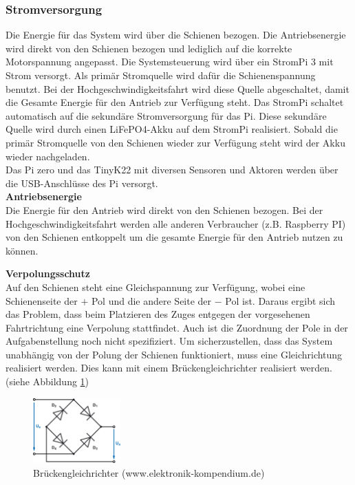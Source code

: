 \documentclass[../../main.tex]{subfiles}
\begin{document}
    \subsubsection{Stromversorgung} \label{et_stromversorgung}
    Die Energie für das System wird über die Schienen bezogen. Die Antriebsenergie wird direkt von den Schienen bezogen und lediglich auf die korrekte Motorspannung angepasst. Die
    Systemsteuerung wird über ein StromPi 3 mit Strom versorgt. Als primär Stromquelle wird dafür die Schienenspannung
    benutzt. Bei der Hochgeschwindigkeitsfahrt wird diese Quelle abgeschaltet, damit die Gesamte Energie für den Antrieb
    zur Verfügung steht. Das StromPi schaltet automatisch auf die sekundäre Stromversorgung für das Pi. Diese sekundäre
    Quelle wird durch einen LiFePO4-Akku auf dem StromPi realisiert. Sobald die primär Stromquelle von den Schienen
    wieder zur Verfügung steht wird der Akku wieder nachgeladen.\\
    Das Pi zero und das TinyK22 mit diversen Sensoren und Aktoren werden über die USB-Anschlüsse des Pi versorgt.\\

    \textbf{Antriebsenergie}\\
    Die Energie für den Antrieb wird direkt von den Schienen bezogen. Bei der Hochgeschwindigkeitsfahrt werden alle anderen Verbraucher (z.B. Raspberry PI) von den Schienen entkoppelt um die gesamte Energie für den Antrieb nutzen zu können.

    \textbf{Verpolungsschutz}\\
    Auf den Schienen steht eine Gleichspannung zur Verfügung, wobei eine Schienenseite der $+$ Pol und die andere Seite der $-$ Pol ist. Daraus ergibt sich das Problem, dass beim Platzieren des Zuges entgegen der vorgesehenen Fahrtrichtung eine Verpolung stattfindet. Auch ist die Zuordnung der Pole in der Aufgabenstellung noch nicht spezifiziert. Um sicherzustellen, dass das System unabhängig von der Polung der Schienen funktioniert, muss eine Gleichrichtung realisiert werden. Dies kann mit einem Brückengleichrichter realisiert werden. (siehe Abbildung \ref{fig:et_bruckengleichrichter})

    \begin{figure}[H]
        \centering
        \includegraphics[width=0.3\textwidth]{Brueckengleichrichter.png}
        \caption {Brückengleichrichter (www.elektronik-kompendium.de)}
        \label{fig:et_bruckengleichrichter}
    \end{figure}
\end{document}
